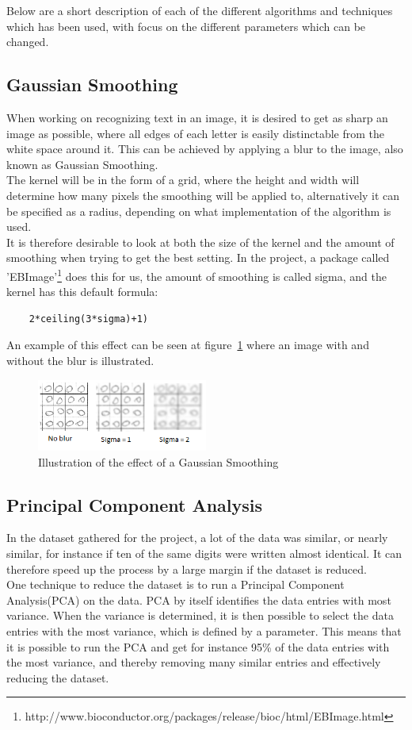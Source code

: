 \documentclass[report]{subfiles}
\begin{document}
\label{sec:theory}
Below are a short description of each of the different algorithms and techniques which has been used, with focus on the different parameters which can be changed.

\subsection{Gaussian Smoothing}
\label{sec:theoryGaussianSmoothing}
When working on recognizing text in an image, it is desired to get as sharp an image as possible, where all edges of each letter is easily distinctable from the white space around it. This can be achieved by applying a blur to the image, also known as Gaussian Smoothing.\\ 
The kernel will be in the form of a grid, where the height and width will determine how many pixels the smoothing will be applied to, alternatively it can be specified as a radius, depending on what implementation of the algorithm is used.\\
It is therefore desirable to look at both the size of the kernel and the amount of smoothing when trying to get the best setting. In the project, a package called 'EBImage'\footnote{http://www.bioconductor.org/packages/release/bioc/html/EBImage.html} does this for us, the amount of smoothing is called sigma, and the kernel has this default formula:
\begin{lstlisting}
	2*ceiling(3*sigma)+1)
\end{lstlisting}
An example of this effect can be seen at figure~\ref{fig:imgExplainBlur} where an image with and without the blur is illustrated.

\begin{figure}[H]
	\centering
	\includegraphics[width=0.5\textwidth]{images/imgBlurDesc}
	\caption{Illustration of the effect of a Gaussian Smoothing}
	\label{fig:imgExplainBlur}
\end{figure}

\subsection{Principal Component Analysis}
\label{sec:theoryPCA}
In the dataset gathered for the project, a lot of the data was similar, or nearly similar, for instance if ten of the same digits were written almost identical. It can therefore speed up the process by a large margin if the dataset is reduced.\\
One technique to reduce the dataset is to run a Principal Component Analysis(PCA) on the data. PCA by itself identifies the data entries with most variance. When the variance is determined, it is then possible to select the data entries with the most variance, which is defined by a parameter. This means that it is possible to run the PCA and get for instance 95\% of the data entries with the most variance, and thereby removing many similar entries and effectively reducing the dataset.
\end{document}
